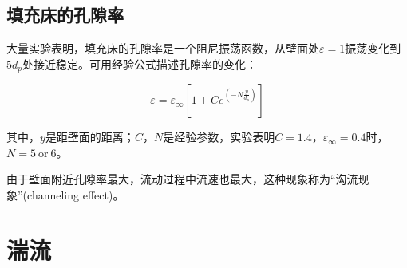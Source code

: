\subsection{填充床的孔隙率}
大量实验表明，填充床的孔隙率是一个阻尼振荡函数，从壁面处$ \varepsilon=1 $振荡变化到$ 5d_p $处接近稳定。可用经验公式描述孔隙率的变化：

\begin{equation}
\varepsilon=\varepsilon_{\infty}\left[ 1+C e^{\left(-N\frac{y}{d_p}\right)} \right]
\end{equation}

其中，$ y $是距壁面的距离；$ C $，$ N $是经验参数，实验表明$ C=1.4 $，$ \varepsilon_{\infty}=0.4 $时，$ N=5\ \text{or}\ 6 $。

由于壁面附近孔隙率最大，流动过程中流速也最大，这种现象称为“沟流现象”(channeling effect)。

\section{湍流}








